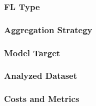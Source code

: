 \subsubsection{FL Type\label{sec:sota.quali.fl.fltype}}

\subsubsection{Aggregation Strategy\label{sec:sota.quali.fl.agg}}

\subsubsection{Model Target\label{sec:sota.quali.fl.target}}

\subsubsection{Analyzed Dataset\label{sec:sota.quali.fl.dataset}}

\subsubsection{Costs and Metrics\label{sec:sota.quali.fl.metrics}}